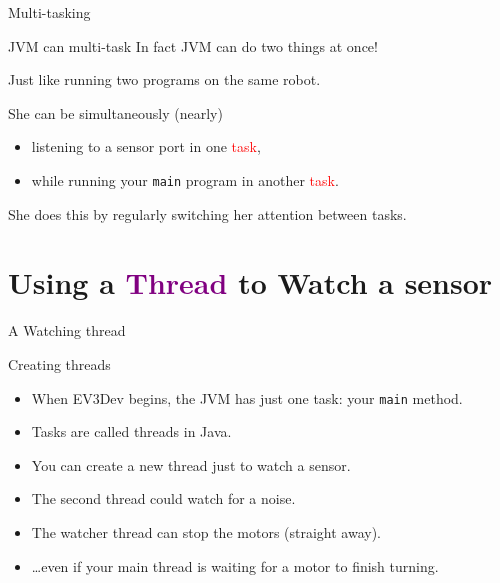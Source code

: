 \documentclass[color=pdftex,usenames,dvipsnames, aspectratio=169]{beamer}
\begin{document}


\begin{frame}{Multi-tasking}
\begin{block}{JVM can multi-task}
In fact JVM can do two things at once!

Just like \alert{running two programs  on the same robot}.

She can be simultaneously (nearly) 
\begin{itemize}
\item listening to a sensor port in one \textcolor{red}{task},
\item  while running your \lstinline!main! program in another \textcolor{red}{task}.
\end{itemize}

She does this by regularly \alert{switching her attention between tasks}.
\end{block}
\end{frame}
\section{Using a \textcolor{purple}{Thread} to Watch a sensor}
\begin{frame}{A Watching thread}
\begin{block}{Creating threads}
\begin{itemize}
\item When EV3Dev begins, the JVM has just one \alert{task}: your \lstinline!main! method.
\item \alert{Tasks} are called \alert{threads} in Java.
\item You can create a new \alert{thread} just to \alert{watch} a sensor.
\item The second thread could \alert{watch} for a noise.
\item The \alert{watcher} thread can stop the motors (straight away).
\item \dots even if your main \alert{thread} is waiting for a motor to finish turning.
\end{itemize}
\end{block}
\end{frame}
\end{document}
